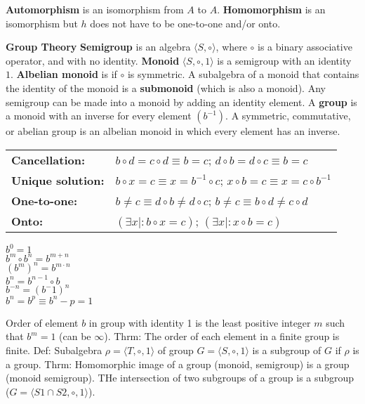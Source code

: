 \documentclass[letterpaper, 8pt]{extarticle}
\begin{document}
\begin{multicols*}{3}
    \textbf{Automorphism} is an isomorphism from $A$ to $A$.
    \textbf{Homomorphism} is an isomorphism but $h$ does not have to be one-to-one and/or onto.

    \textbf{Group Theory}
    \textbf{Semigroup} is an algebra $\langle S, \circ \rangle$, where $\circ$ is a binary associative operator,
    and with no identity.
    \textbf{Monoid} $\langle S, \circ, 1 \rangle$ is a semigroup with an identity $1$.
    \textbf{Albelian monoid} is if $\circ$ is symmetric.
    A subalgebra of a monoid that contains the identity of the monoid is a \textbf{submonoid} (which is also a monoid).
    Any semigroup can be made into a monoid by adding an identity element.
    A \textbf{group} is a monoid with an inverse for every element $(b^{-1})$.
    A symmetric, commutative, or abelian group is an albelian monoid in which every element has an inverse.

    \begin{tabulary}{\linewidth}{@{}LL@{}}
        \textbf{Cancellation:}  & $b \circ d = c \circ d \equiv b = c$; $d \circ b = d \circ c \equiv b = c$ \\
        \textbf{Unique solution:}   & $b \circ x = c \equiv x = b^{-1} \circ c$; $x \circ b = c \equiv x = c \circ b^{-1}$ \\
        \textbf{One-to-one:}    & $b \neq c \equiv d \circ b \neq d \circ c$; $b \neq c \equiv b \circ d \neq c \circ d$ \\
        \textbf{Onto:}  & $(\exists x \mid : b \circ x = c)$; $(\exists x \mid : x \circ b = c)$ \\
    \end{tabulary}
    \vspace{1em}
    \begin{multicols*}{2}
        $b^0 = 1$ \\
        $b^m \circ b^n = b^{m+n}$ \\
        $(b^m)^n = b^{m \cdot n}$ \\
        $b^n = b^{n-1} \circ b$ \\
        $b^{-n} = (b^-1)^n$ \\
        $b^n = b^p \equiv b^n-p = 1$ \\
    \end{multicols*}

    Order of element $b$ in group with identity 1 is the least positive integer $m$
    such that $b^m = 1$ (can be $\infty$).
    Thrm: The order of each element in a finite group is finite.
    Def: Subalgebra $\rho = \langle T, \circ, 1 \rangle$ of
    group $G = \langle S, \circ, 1 \rangle$ is a subgroup of $G$ if $\rho$ is a group.
    Thrm: Homomorphic image of a group (monoid, semigroup) is a group (monoid semigroup).
    THe intersection of two subgroups of a group is a subgroup ($G = \langle S1 \cap S2, \circ, 1 \rangle$).


\end{multicols*}
\end{document}
